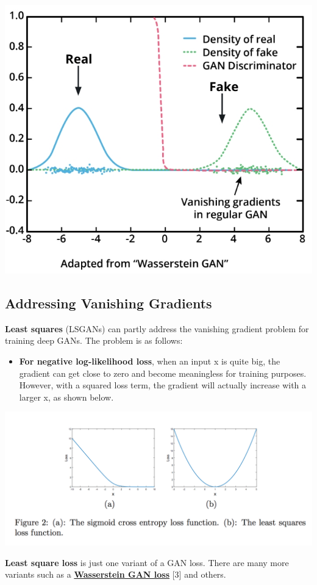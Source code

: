 \includegraphics[width=0.5\linewidth]{img//genAdvNet//modernGAN/screen-shot-2022-06-29-at-4.23.02-pm.jpeg}


\subsection{Addressing Vanishing Gradients}
\textbf{Least squares} (LSGANs) can partly address the vanishing gradient problem for training deep GANs.
The problem is as follows:
\begin{itemize}
    \item \textbf{For negative log-likelihood loss}, when an input x is quite big, the gradient can get close to zero and become meaningless for training purposes. However, with a squared loss term, the gradient will actually increase with a larger x, as shown below.
\end{itemize}

\includegraphics[width=0.75\linewidth]{img//genAdvNet//modernGAN/screen-shot-2018-11-10-at-7.38.03-pm.png}

\textbf{Least square loss} is just one variant of a GAN loss. There are many more variants such as a \href{https://arxiv.org/abs/1701.07875}{\textbf{Wasserstein GAN loss}} [3] and others. \newline

